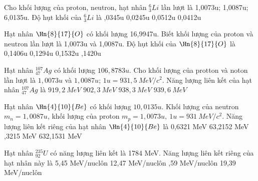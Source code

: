 \begin{vidu}%
 Cho khối lượng của proton, neutron, hạt nhân $_3^6Li$ lần lượt là 1,0073u; 1,0087u; 6,0135u. Độ hụt khối của $_3^6Li$ là
\choice
{,0345u}
{0,0245u}
{0,0512u}
{0,0412u}
\end{vidu}
\begin{vidu}%
 Hạt nhân $\Hn{8}{17}{O}$ có khối lượng 16,9947u. Biết khối lượng của proton và neutron lần lượt là 1,0073u và 1,0087u. Độ hụt khối của $\Hn{8}{17}{O}$ là	
\choice
{0,1406u}
{0,1294u}
{0,1532u}
{,1420u}
\end{vidu}
\begin{vidu} %
 	Hạt nhân $_{47}^{107}Ag$ có khối lượng $106,8783u $. Cho khối lượng của protton và noton lần lượt là $1,0073u$ và $1,0087u$; $1u=931,5\ MeV/c^2$. Năng lượng liên kết của hạt nhân $_{47}^{107}Ag$ là
\choice
{\True $919,2\ MeV$}
{$902,3\ MeV$}
{$938,3\ MeV$}
{$939,6\ MeV$}
\end{vidu}
\begin{vidu}%
 Hạt nhân $\Hn{4}{10}{Be}$ có khối lượng $10,0135u$. Khối lượng của neutron $m_n = 1,0087u$, khối lượng của proton $m_p = 1,0073u,\ 1u = 931\ MeV/c^2$. Năng lượng liên kết riêng của hạt nhân $\Hn{4}{10}{Be}$ là
\choice
{0,6321 MeV}
{63,2152 MeV}
{,3215 MeV}
{632,1531 MeV}
\end{vidu}
\begin{vidu}%
 Hạt nhân $_{92}^{235}U$ có năng lượng liên kết là 1784 MeV. Năng lượng liên kết riêng của hạt nhân này là
\choice
{5,45 MeV/nuclôn}
{12,47 MeV/nuclôn}
{,59 MeV/nuclôn}
{19,39 MeV/nuclôn}
\end{vidu}
